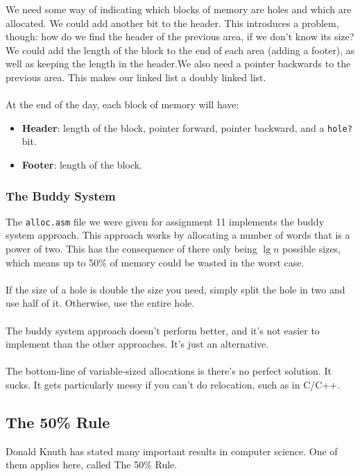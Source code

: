 \documentclass[]{article}
\theoremstyle{definition}
\begin{document}
				We need some way of indicating which blocks of memory are holes and which are allocated. We could add another bit to the header. This introduces a problem, though: how do we find the header of the previous area, if we don't know its size? We could add the length of the block to the end of each area (adding a footer), as well as keeping the length in the header.We also need a pointer backwards to the previous area. This makes our linked list a doubly linked list.
				\\ \\
				At the end of the day, each block of memory will have:
				\begin{itemize}
					\item \textbf{Header}: length of the block, pointer forward, pointer backward, and a \verb+hole?+ bit.
					\item \textbf{Footer}: length of the block.
				\end{itemize}
				
			\subsubsection{The Buddy System}
				The \verb+alloc.asm+ file we were given for assignment 11 implements the buddy system approach. This approach works by allocating a number of words that is a power of two. This has the consequence of there only being $\lg n$ possible sizes, which means up to 50\% of memory could be wasted in the worst case.
				\\ \\
				If the size of a hole is double the size you need, simply split the hole in two and use half of it. Otherwise, use the entire hole.
				\\ \\
				The buddy system approach doesn't perform better, and it's not easier to implement than the other approaches. It's just an alternative.
				\\ \\
				The bottom-line of variable-sized allocations is there's no perfect solution. It sucks. It gets particularly messy if you can't do relocation, such as in C/C++.
				
		\subsection{The 50\% Rule}
			Donald Knuth has stated many important results in computer science. One of them applies here, called The 50\% Rule.
			
\end{document}
